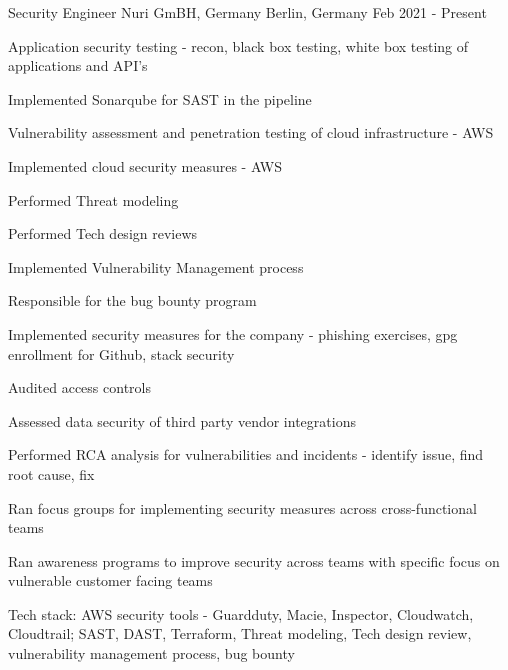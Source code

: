 
\begin{cventries}

\cventry
    {Security Engineer} %
    {Nuri GmBH, Germany} %
    {Berlin, Germany} %
    {Feb 2021 - Present} %
    {
      \begin{cvitems} %
        \item {Application security testing - recon, black box testing, white box testing of applications and API's}
        \item {Implemented Sonarqube for SAST in the pipeline}
        \item {Vulnerability assessment and penetration testing of cloud infrastructure - AWS}
        \item {Implemented cloud security measures - AWS}
        \item {Performed Threat modeling}
        \item {Performed Tech design reviews}
        \item {Implemented Vulnerability Management process}
        \item {Responsible for the bug bounty program}
        \item {Implemented security measures for the company - phishing exercises, gpg enrollment for Github, stack security}
        \item {Audited access controls}
        \item {Assessed data security of third party vendor integrations}
        \item {Performed RCA analysis for vulnerabilities and incidents - identify issue, find root cause, fix}
        \item {Ran focus groups for implementing security measures across cross-functional teams}
        \item {Ran awareness programs to improve security across teams with specific focus on vulnerable customer facing teams}
        \item {Tech stack: AWS security tools - Guardduty, Macie, Inspector, Cloudwatch, Cloudtrail; SAST, DAST, Terraform, Threat modeling, Tech design review, vulnerability management process, bug bounty}
      \end{cvitems}
    }


\end{cventries}

